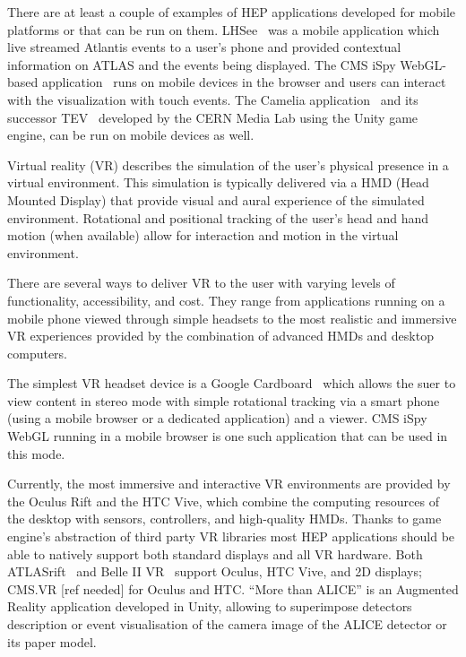\documentclass[12pt,a4paper]{article}
\begin{document}
There are at least a couple of examples of HEP applications developed for mobile platforms or that can be run on them. LHSee~\cite{LHSee}
was a mobile application which live streamed Atlantis events to a user’s phone and provided contextual information on ATLAS and the
events being displayed. The CMS iSpy WebGL-based application~\cite{CMSISpyWebGL} runs on mobile devices in the browser and users can interact
with the visualization with touch events. The Camelia application~\cite{CERNCamelia} and its successor TEV~\cite{CERNTEV} developed by the
CERN Media Lab using the Unity game engine, can be run on mobile devices as well.

Virtual reality (VR) describes the simulation of the user’s physical presence in a virtual environment. This simulation is typically
delivered via a HMD (Head Mounted Display) that provide visual and aural experience of the simulated environment. Rotational and
positional tracking of the user’s head and hand motion (when available) allow for interaction and motion in the virtual environment.

There are several ways to deliver VR to the user with varying levels of functionality, accessibility, and cost. They range from
applications running on a mobile phone viewed through simple headsets to the most realistic and immersive VR experiences provided
by the combination of advanced HMDs and desktop computers.

The simplest VR headset device is a Google Cardboard~\cite{GoogleCardboard} which allows the suer to view content in stereo mode with
simple rotational tracking via a smart phone (using a mobile browser or a dedicated application) and a viewer. CMS iSpy WebGL running
in a mobile browser is one such application that can be used in this mode.

Currently, the most immersive and interactive VR environments are provided by the Oculus Rift and the HTC Vive, which combine the
computing resources of the desktop with sensors, controllers, and high-quality HMDs. Thanks to game engine’s abstraction of third
party VR libraries most HEP applications should be able to natively support both standard displays and all VR hardware.
Both ATLASrift~\cite{ATLASRift} and Belle II VR~\cite{BelleIIVR} support Oculus, HTC Vive, and 2D displays; CMS.VR [ref needed] for
Oculus and HTC. “More than ALICE” is an Augmented Reality application developed in Unity, allowing to superimpose detectors description or event
visualisation of the camera image of the ALICE detector or its paper model.
\end{document}
